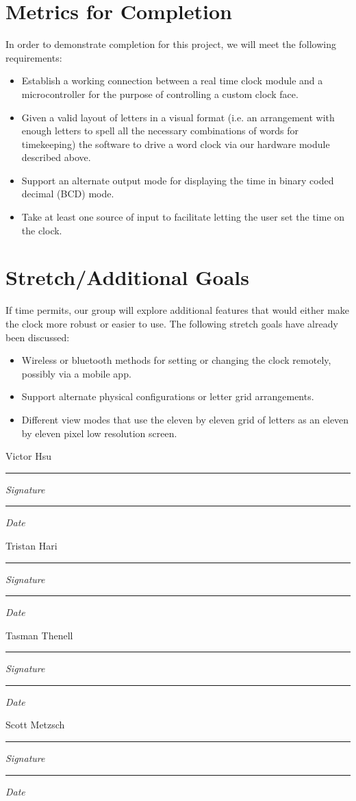 \documentclass[10pt,draftclsnofoot,onecolumn]{IEEEtran}
\newcommand{\namesigdate}[2][5cm]{%
\begin{minipage}{#1}
    #2 \vspace{1.0cm}\hrule\smallskip
    \small \textit{Signature}
    \vspace{1.0cm}\hrule\smallskip
    \small \textit{Date}
\end{minipage}
}
\begin{document}
\section{Metrics for Completion}
In order to demonstrate completion for this project, we will meet the following requirements:
\begin{itemize}
  \item Establish a working connection between a real time clock module and a
  microcontroller for the purpose of controlling a custom clock face.
  \item Given a valid layout of letters in a visual format (i.e. an arrangement
  with enough letters to spell all the necessary combinations of words for
  timekeeping) the software to drive a word clock via our hardware module
  described above.
  \item Support an alternate output mode for displaying the time in binary coded
  decimal (BCD) mode.
  \item Take at least one source of input to facilitate letting the user set the
  time on the clock.
\end{itemize}

\section{Stretch/Additional Goals}
If time permits, our group will explore additional features that would either
make the clock more robust or easier to use. The following stretch goals have
already been discussed:
\begin{itemize}
  \item Wireless or bluetooth methods for setting or changing the clock remotely,
  possibly via a mobile app.
  \item Support alternate physical configurations or letter grid arrangements.
  \item Different view modes that use the eleven by eleven grid of letters as an
  eleven by eleven pixel low resolution screen.
\end{itemize}

\newpage
\newpage

\noindent \namesigdate{Victor Hsu} \hfill \namesigdate{Tristan Hari}
\noindent \namesigdate{Tasman Thenell} \hfill \namesigdate{Scott Metzsch}
\end{document}
